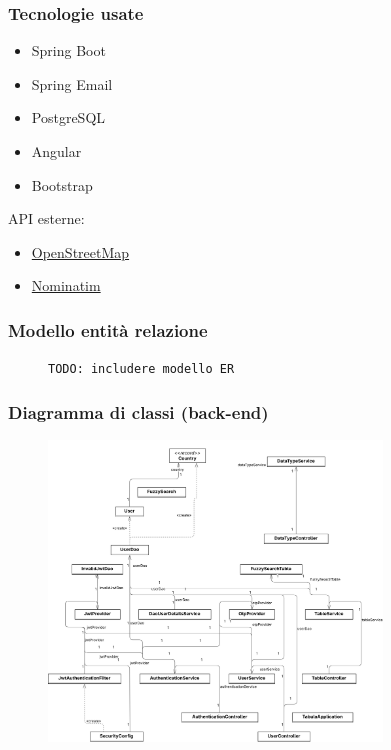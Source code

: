 \documentclass{beamer}
\begin{document}
\begin{frame}
  \frametitle{Tecnologie usate}

  \begin{itemize}
    \item[\faLeaf] Spring Boot
    \item[\faEnvelope] Spring Email
    \item[\faDatabase] PostgreSQL
  \end{itemize}

  \vspace{15pt}

  \begin{itemize}
    \item[\faHtml5] Angular
    \item[\faCss3] Bootstrap
  \end{itemize}

  \vspace{18pt}

  API esterne:
  \begin{itemize}
    \item[\faMapMarker] \href{https://www.openstreetmap.org/}{OpenStreetMap}
    \item[\faMapSigns] \href{https://nominatim.openstreetmap.org/}{Nominatim}
  \end{itemize}
\end{frame}

\begin{frame}
  \frametitle{Modello entità relazione}
  \begin{figure}
    \texttt{TODO: includere modello ER}
  \end{figure}
\end{frame}

\begin{frame}
  \frametitle{Diagramma di classi (back-end)}
  \begin{figure}
    \includegraphics[height=8cm]{classes}
  \end{figure}
\end{frame}
\end{document}
